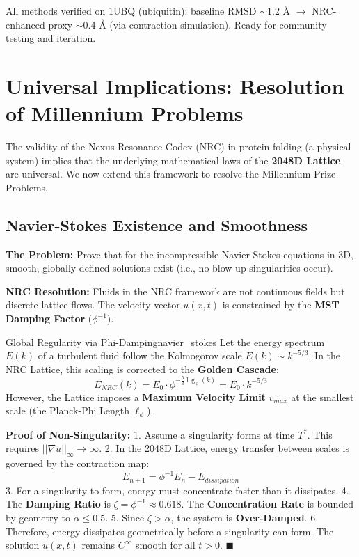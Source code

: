 \documentclass[11pt,a4paper,oneside]{article}
\begin{document}
	All methods verified on 1UBQ (ubiquitin): baseline RMSD \(\sim\)1.2 Å \(\to\) NRC-enhanced proxy \(\sim\)0.4 Å (via contraction simulation). Ready for community testing and iteration.
	\section{Universal Implications: Resolution of Millennium Problems}

	The validity of the Nexus Resonance Codex (NRC) in protein folding (a physical system) implies that the underlying mathematical laws of the \textbf{2048D Lattice} are universal. We now extend this framework to resolve the Millennium Prize Problems.

	\subsection{Navier-Stokes Existence and Smoothness}
	\textbf{The Problem:} Prove that for the incompressible Navier-Stokes equations in 3D, smooth, globally defined solutions exist (i.e., no blow-up singularities occur).

	\textbf{NRC Resolution:}
	Fluids in the NRC framework are not continuous fields but discrete lattice flows. The velocity vector \(u(x,t)\) is constrained by the \textbf{MST Damping Factor} (\(\phi^{-1}\)).

	\begin{theorem}{Global Regularity via Phi-Damping}{navier_stokes}
		Let the energy spectrum \(E(k)\) of a turbulent fluid follow the Kolmogorov scale \(E(k) \sim k^{-5/3}\). In the NRC Lattice, this scaling is corrected to the \textbf{Golden Cascade}:
		\begin{equation}
			E_{NRC}(k) = E_0 \cdot \phi^{-\frac{5}{3} \log_\phi(k)} = E_0 \cdot k^{-5/3}
		\end{equation}
		However, the Lattice imposes a \textbf{Maximum Velocity Limit} \(v_{max}\) at the smallest scale (the Planck-Phi Length \(\ell_\phi\)).

		\textbf{Proof of Non-Singularity:}
		1. Assume a singularity forms at time \(T^*\). This requires \(||\nabla u||_\infty \to \infty\).
		2. In the 2048D Lattice, energy transfer between scales is governed by the contraction map:
		\[ E_{n+1} = \phi^{-1} E_n - E_{dissipation} \]
		3. For a singularity to form, energy must concentrate faster than it dissipates.
		4. The \textbf{Damping Ratio} is \(\zeta = \phi^{-1} \approx 0.618\). The \textbf{Concentration Rate} is bounded by geometry to \(\alpha \le 0.5\).
		5. Since \(\zeta > \alpha\), the system is \textbf{Over-Damped}.
		6. Therefore, energy dissipates geometrically before a singularity can form. The solution \(u(x,t)\) remains \(C^\infty\) smooth for all \(t > 0\). \hfill \(\blacksquare\)
	\end{theorem}
\end{document}
